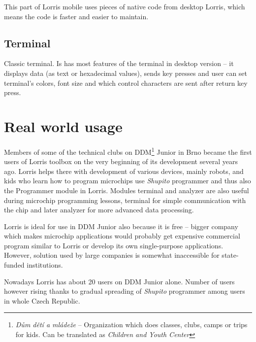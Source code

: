 \documentclass[12pt, a4paper, oneside]{article}
\newcommand{\It}{\textit}  %
\begin{document}
This part of Lorris mobile uses pieces of native code from desktop Lorris, which means the code is faster and easier to maintain.

\subsection{Terminal}
Classic terminal. Is has most features of the terminal in desktop version -- it displays data (as text or hexadecimal values), sends key presses and user can set terminal's colors, font size and which control characters are sent after return key press.

\section{Real world usage}
\label{usage}
Members of some of the technical clubs on DDM\footnote{\It{Dům dětí a mládeže} -- Organization which does classes, clubs, camps or trips for kids. Can be translated as \It{Children and Youth Center}} Junior in Brno became the first users of Lorris toolbox on the very beginning of its development several years ago. Lorris helps there with development of various devices, mainly robots, and kids who learn how to program microchips use \It{Shupito} programmer and thus also the Programmer module in Lorris. Modules terminal and analyzer are also useful during microchip programming lessons, terminal for simple communication with the chip and later analyzer for more advanced data processing.

Lorris is ideal for use in DDM Junior also because it is free -- bigger company which makes microchip applications would probably get expensive commercial program similar to Lorris or develop its own single-purpose applications. However, solution used by large companies is somewhat inaccessible for state-funded institutions.

Nowadays Lorris has about 20 users on DDM Junior alone. Number of users however rising thanks to gradual spreading of \It{Shupito} programmer among users in whole Czech Republic.
\end{document}
